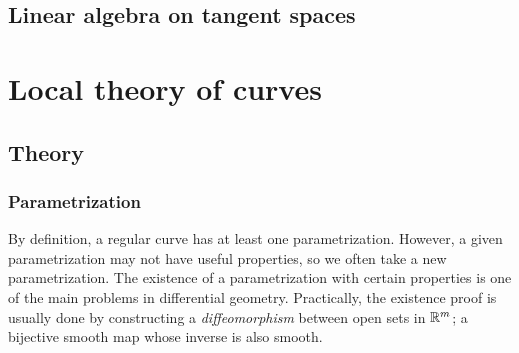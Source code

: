 \documentclass{../exp}
\begin{document}
\subsection{Linear algebra on tangent spaces}






























\section{Local theory of curves}

\subsection{Theory}

\subsubsection{Parametrization}

By definition, a regular curve has at least one parametrization.
However, a given parametrization may not have useful properties, so we often take a new parametrization.
The existence of a parametrization with certain properties is one of the main problems in differential geometry.
Practically, the existence proof is usually done by constructing a \emph{diffeomorphism} between open sets in $\mathbb{R}^m$; a bijective smooth map whose inverse is also smooth.
\end{document}
